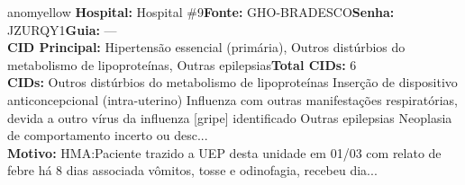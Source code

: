 \documentclass[a4paper,10pt]{article}
\begin{document}
\begin{anomalycard}[Interna\c{c}\~{a}o \#119865 | Pac. \#99405 | MODERADO (z=2.70) | LOS: 5d | 01/03/2026\,$\to$\,06/03/2026]{anomyellow}
\textbf{Hospital:} Hospital \#9\quad \textbf{Fonte:} GHO-BRADESCO\quad \textbf{Senha:} JZURQY1\quad \textbf{Guia:} ---\\

\textbf{CID Principal:} {\small Hipertensão essencial (primária), Outros distúrbios do metabolismo de lipoproteínas, Outras epilepsias}\quad\textbf{Total CIDs:} 6\\

\textbf{CIDs:} {\scriptsize Outros distúrbios do metabolismo de lipoproteínas \textbar{} Inserção de dispositivo anticoncepcional (intra-uterino) \textbar{} Influenza com outras manifestações respiratórias, devida a outro vírus da influenza [gripe] identificado \textbar{} Outras epilepsias \textbar{} Neoplasia de comportamento incerto ou desc...}\\

\textbf{Motivo:} {\scriptsize HMA:Paciente trazido a UEP desta unidade em 01/03 com relato de febre há 8 dias associada vômitos, tosse e odinofagia, recebeu dia...}\\




\end{anomalycard}
\end{document}
